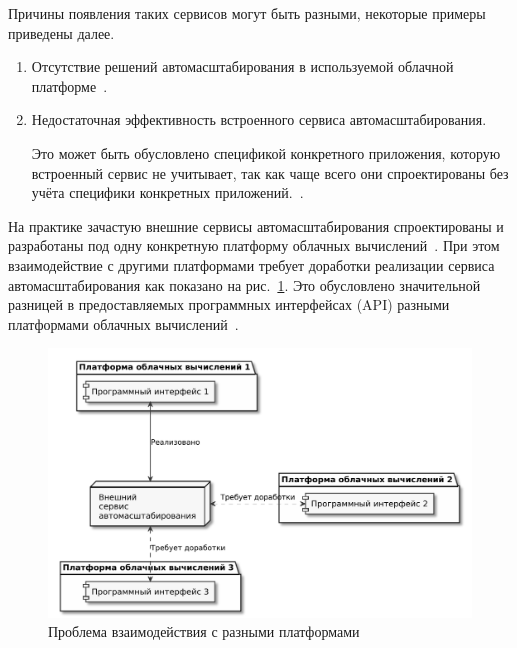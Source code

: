 Причины появления таких сервисов могут быть разными, некоторые примеры приведены далее.
\begin{enumerate}
    \item Отсутствие решений автомасштабирования в используемой облачной платформе~\cite{fake-27}.
    \item Недостаточная эффективность встроенного сервиса автомасштабирования.
    
    Это может быть обусловлено спецификой конкретного приложения, которую встроенный сервис не учитывает, так как чаще всего они спроектированы без учёта специфики конкретных приложений.~\cite{fake-29}.
\end{enumerate}

На практике зачастую внешние сервисы автомасштабирования спроектированы и разработаны под одну конкретную платформу облачных вычислений~\cite{fake-30}.
При этом взаимодействие с другими платформами требует доработки реализации сервиса автомасштабирования как показано на рис.~\ref{ext-different-apis}. 
Это обусловлено значительной разницей в предоставляемых программных интерфейсах (API) разными платформами облачных вычислений~\cite{fake-31}.

\begin{figure}[hbtp]
    \centering
    \includegraphics[width=\textwidth]{img/ext-different-apis.pdf}
    \caption{Проблема взаимодействия с разными платформами}
    \label{ext-different-apis}
\end{figure}
